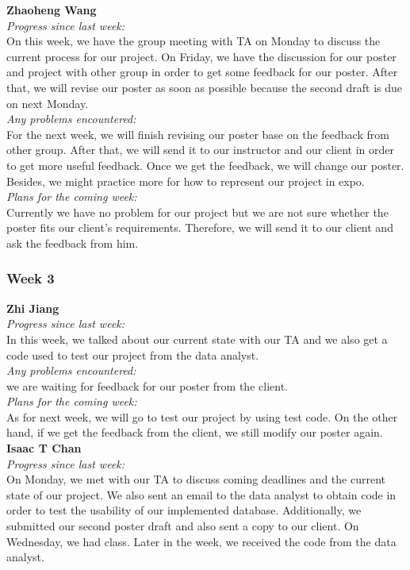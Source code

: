 \noindent\textbf{Zhaoheng Wang}\\
\noindent\textit{Progress since last week:}\\
On this week, we have the group meeting with TA on Monday to discuss the current process for our project. On Friday, we have the discussion for our poster and project with other group in order to get some feedback for our poster. After that, we will revise our poster as soon as possible because the second draft is due on next Monday.\\

\noindent\textit{Any problems encountered:}\\
For the next week, we will finish revising our poster base on the feedback from other group. After that, we will send it to our instructor and our client in order to get more useful feedback. Once we get the feedback, we will change our poster. Besides, we might practice more for how to represent our project in expo.\\

\noindent\textit{Plans for the coming week:}\\
Currently we have no problem for our project but we are not sure whether the poster fits our client's requirements. Therefore, we will send it to our client and ask the feedback from him.

\subsubsection{Week 3}
\textbf{Zhi Jiang}\\
\noindent\textit{Progress since last week:}\\
In this week, we talked about our current state with our TA and we also get a code used to test our project from the data analyst.\\

\noindent\textit{Any problems encountered:}\\
we are waiting for feedback for our poster from the client.\\

\noindent\textit{Plans for the coming week:}\\
As for next week, we will go to test our project by using test code. On the other hand, if we get the feedback from the client, we still modify our poster again.\\

\noindent\textbf{Isaac T Chan}\\
\noindent\textit{Progress since last week:}\\
On Monday, we met with our TA to discuss coming deadlines and the current state of our project. We also sent an email to the data analyst to obtain code in order to test the usability of our implemented database. Additionally, we submitted our second poster draft and also sent a copy to our client. On Wednesday, we had class. Later in the week, we received the code from the data analyst.\\

